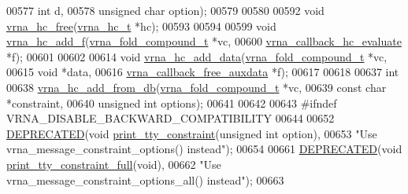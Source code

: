 \begin{DoxyCode}
00577                                 \textcolor{keywordtype}{int}                   d,
00578                                 \textcolor{keywordtype}{unsigned} \textcolor{keywordtype}{char}         option);
00579 
00580 
00592 \textcolor{keywordtype}{void} \mbox{\hyperlink{group__hard__constraints_ga696dcf77887d856c6f21ea266d8b9ca2}{vrna\_hc\_free}}(\mbox{\hyperlink{group__hard__constraints_structvrna__hc__s}{vrna\_hc\_t}} *hc);
00593 
00594 
00599 \textcolor{keywordtype}{void} \mbox{\hyperlink{constraints__hard_8h_af220427ba7ecc8e786a07b7799658f18}{vrna\_hc\_add\_f}}(\mbox{\hyperlink{group__fold__compound_structvrna__fc__s}{vrna\_fold\_compound\_t}}       *vc,
00600                    \mbox{\hyperlink{group__hard__constraints_gae465f1d4a3d8b6592b38ecbb0d9f613d}{vrna\_callback\_hc\_evaluate}}  *f);
00601 
00602 
00614 \textcolor{keywordtype}{void} \mbox{\hyperlink{constraints__hard_8h_a128920e0af52e4196a9d59fa13336c7c}{vrna\_hc\_add\_data}}(\mbox{\hyperlink{group__fold__compound_structvrna__fc__s}{vrna\_fold\_compound\_t}}        *vc,
00615                       \textcolor{keywordtype}{void}                        *data,
00616                       \mbox{\hyperlink{group__fold__compound_ga7806651f51b195013839a218b3bbd5a3}{vrna\_callback\_free\_auxdata}}  *f);
00617 
00618 
00637 \textcolor{keywordtype}{int}
00638 \mbox{\hyperlink{group__hard__constraints_ga5b4de3247b67358080c176b94591a8e6}{vrna\_hc\_add\_from\_db}}(\mbox{\hyperlink{group__fold__compound_structvrna__fc__s}{vrna\_fold\_compound\_t}}  *vc,
00639                     \textcolor{keyword}{const} \textcolor{keywordtype}{char}            *constraint,
00640                     \textcolor{keywordtype}{unsigned} \textcolor{keywordtype}{int}          options);
00641 
00642 
00643 \textcolor{preprocessor}{#ifndef VRNA\_DISABLE\_BACKWARD\_COMPATIBILITY}
00644 
00652 \mbox{\hyperlink{constraints__hard_8h_aab347a3c03fbe8e7319551b9fa0cce4a}{DEPRECATED}}(\textcolor{keywordtype}{void} \mbox{\hyperlink{constraints__hard_8h_a4d167deb70bb51723e44374dc981deb2}{print\_tty\_constraint}}(\textcolor{keywordtype}{unsigned} \textcolor{keywordtype}{int} option),
00653           \textcolor{stringliteral}{"Use vrna\_message\_constraint\_options() instead"});
00654 
00661 \mbox{\hyperlink{constraints__hard_8h_aab347a3c03fbe8e7319551b9fa0cce4a}{DEPRECATED}}(\textcolor{keywordtype}{void} \mbox{\hyperlink{constraints__hard_8h_ae8ae8a34962b9959be3f6c40f0a80ac1}{print\_tty\_constraint\_full}}(\textcolor{keywordtype}{void}),
00662           \textcolor{stringliteral}{"Use vrna\_message\_constraint\_options\_all() instead"});
00663 

\end{DoxyCode}

